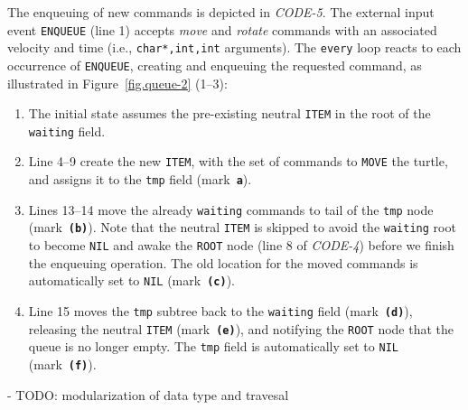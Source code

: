 \documentclass{sig-alternate}
\newcommand{\code}[1] {{\small{\texttt{#1}}}}
\newcommand{\MM}[1] {{\textbf{\texttt{#1}}}}
\begin{document}
The enqueuing of new commands is depicted in \emph{CODE-5}.
The external input event \code{ENQUEUE} (line 1) accepts \emph{move} and 
\emph{rotate} commands with an associated velocity and time (i.e., 
\code{char*,int,int} arguments).
The \code{every} loop reacts to each occurrence of \code{ENQUEUE}, creating and 
enqueuing the requested command, as illustrated in Figure~\ref{fig.queue-2} 
(1--3):
%
\begin{enumerate}[start=0]
%
\item The initial state assumes the pre-existing neutral \code{ITEM} in the 
root of the \code{waiting} field.
%
\item Line 4--9 create the new \code{ITEM}, with the set of commands to 
\code{MOVE} the turtle, and assigns it to the \code{tmp} field (mark~\MM{a}).
%
\item Lines 13--14 move the already \code{waiting} commands to tail of the 
\code{tmp} node (mark~\MM{(b)}).
Note that the neutral \code{ITEM} is skipped to avoid the \code{waiting} root 
to become \code{NIL} and awake the \code{ROOT} node (line 8 of \emph{CODE-4}) 
before we finish the enqueuing operation.
The old location for the moved commands is automatically set to \code{NIL} 
(mark~\MM{(c)}).
%
\item Line 15 moves the \code{tmp} subtree back to the \code{waiting} field 
(mark~\MM{(d)}), releasing the neutral \code{ITEM} (mark~\MM{(e)}), and 
notifying the \code{ROOT} node that the queue is no longer empty.
The \code{tmp} field is automatically set to \code{NIL} (mark~\MM{(f)}).
%
\end{enumerate}
%

- TODO: modularization of data type and travesal
\end{document}
